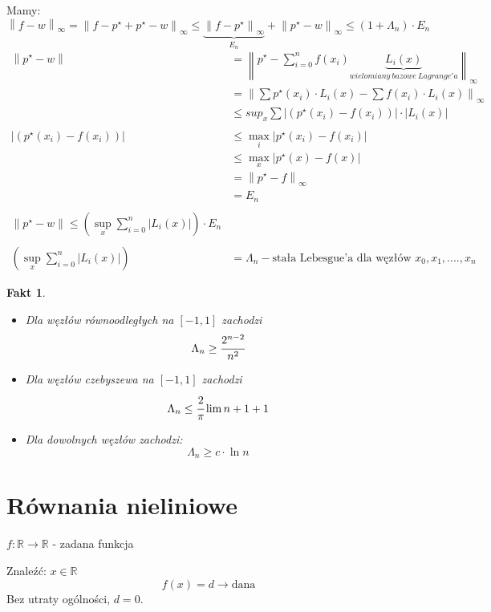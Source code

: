 \documentclass[hidelinks,a4paper,fleqn,oneside]{book}
\newcommand{\RR}{\mathbb{R}}
\newcommand{\ra}{\rightarrow}
\newcommand{\norm}[1]{\left\lVert#1\right\rVert}
\newtheorem{fakt}{Fakt}
\begin{document}
Mamy:
\[
	\norm{f-w}_\infty = \norm{f - p^\star + p^\star - w}_\infty \leq \underbrace{\norm{f-p^\star}_\infty}_{E_n} + \norm{p^\star - w}_\infty \leq (1 + \Lambda_n)\cdot E_n
\]
\[
\begin{array}{ll}
	\norm{p^\star - w} & = \norm{p^\star - \sum_{i=0}^n f(x_i) \underbrace{L_i(x)}_{wielomiany\ bazowe\ Lagrange'a}}_\infty \\
	& = \norm{\sum p^\star(x_i) \cdot L_i(x) - \sum f(x_i)\cdot L_i(x)}_\infty \\
	& \leq sup_x \sum |(p^\star(x_i) - f(x_i))| \cdot |L_i(x)|\\
	& \\
	|(p^\star(x_i) - f(x_i))| & \leq \max_i |p^\star(x_i) - f(x_i)| \\
	& \leq \max_x |p^\star(x) - f(x)| \\
	& = \norm{p^\star - f}_\infty \\
	& = E_n
	\\
	& \\
	\norm{p^\star - w} \leq (\sup_x \sum_{i=0}^n |L_i(x)|) \cdot E_n \\
	& \\
	(\sup_x \sum_{i=0}^n |L_i(x)|) & = \Lambda_n - \textrm{stała Lebesgue'a dla węzłów }x_0, x_1, ...., x_n
\end{array}
\]

\begin{fakt}
\begin{itemize}$ $

	\item Dla węzłów równoodległych na $[-1, 1]$ zachodzi \[
		\Lambda_n \geq \cfrac{2^{n-2}}{n^2}
	\]
	\item Dla węzłów czebyszewa na $[-1, 1]$ zachodzi \[
		\Lambda_n \leq \cfrac{2}{\pi} \lim{n+1}+1
	\]
	\item Dla dowolnych węzłów zachodzi: \[
		\Lambda_n \geq c \cdot \ln{n}
	\]
\end{itemize}
\end{fakt}


\section{Równania nieliniowe}

$f: \RR \ra \RR$ - zadana funkcja

Znaleźć: $x \in \RR$
\[
	f(x) = d \ra \textrm{dana}
\]
Bez utraty ogólności, $d = 0$.

\begin{tikzpicture}
	
\end{tikzpicture}
\end{document}

